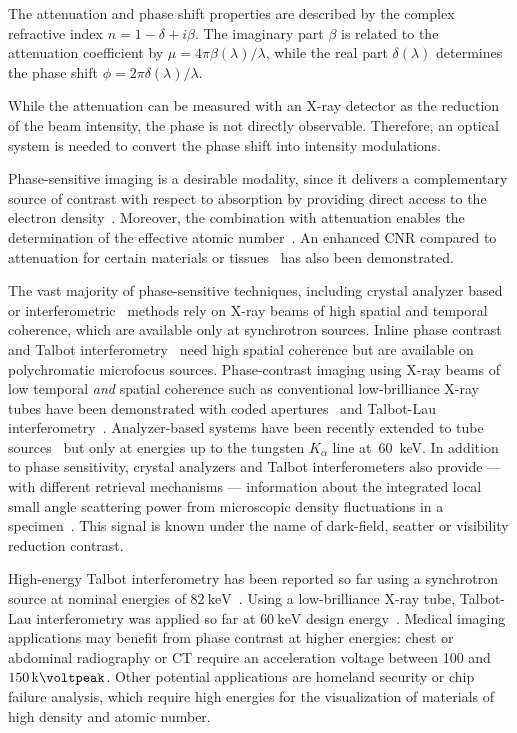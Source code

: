 \documentclass[english]{nature}
\begin{document}
The attenuation and phase shift properties are described by the complex
refractive index $n=1 - \delta + i \beta$. The imaginary part $\beta$ is
related to the attenuation coefficient by $\mu = 4 \pi \beta(\lambda) /
\lambda$, while the real part $\delta(\lambda)$ determines the phase shift
$\phi = 2 \pi \delta(\lambda) / \lambda$.

While the attenuation can be measured with an X-ray detector as the
reduction of the beam intensity, the phase is not directly observable.
Therefore, an optical system is needed to convert the phase shift into
intensity modulations.

Phase-sensitive imaging is a desirable modality, since it delivers a
complementary source of contrast with respect to absorption by providing
direct access to the electron density~\cite[extras{, p.71}]{Als-Nielsen2011}. Moreover, the
combination with attenuation enables the determination of the effective
atomic number~\cite{Qi2010}. An enhanced \ac{CNR} compared to
attenuation for certain materials or
tissues~\cite{Pfeiffer2007a,McDonald2009} has also been demonstrated.

The vast majority of phase-sensitive techniques, including crystal analyzer
based~\cite{Davis1995,Chapman1997} or
interferometric~\cite{Bonse1965,Momose1996} methods rely on X-ray beams of
high spatial and temporal coherence, which are available only at synchrotron
sources. Inline phase contrast~\cite{Snigirev1995,Wilkins1996,Cloetens1996}
and Talbot interferometry~\cite{Cloetens1997,David2002,Momose2003a} need
high spatial coherence but are available on polychromatic microfocus
sources. Phase-contrast imaging using X-ray beams of low temporal \emph{and}
spatial coherence such as conventional low-brilliance X-ray tubes have been
demonstrated with coded apertures~\cite{Munro2012} and Talbot-Lau
interferometry~\cite{Pfeiffer2006}. Analyzer-based systems have been
recently extended to tube sources~\cite{Nesch2009,Parham2009} but only at
energies up to the tungsten $K_\alpha$ line at~\SI{60}{\kilo\eV}. In
addition to phase sensitivity, crystal analyzers and Talbot interferometers
also provide --- with different retrieval mechanisms --- information
about the integrated local small angle scattering power from microscopic
density fluctuations in a specimen~\cite{Pfeiffer2008}. This signal is known
under the name of dark-field, scatter or visibility reduction contrast.

High-energy Talbot interferometry has been reported so far using a
synchrotron source at nominal energies of
$\SI{82}{\kilo\electronvolt}$~\cite{Willner2013}. Using a low-brilliance
X-ray tube, Talbot-Lau interferometry was applied so far at
$\SI{60}{\kilo\electronvolt}$ design energy~\cite{Donath2009a}. Medical imaging
applications may benefit from phase contrast at higher energies: chest or
abdominal radiography or \ac{CT} require an acceleration voltage between
\num{100} and $\SI{150}{\kilo\voltpeak}$. Other potential applications are
homeland security or chip failure analysis, which require high energies for
the visualization of materials of high density and atomic number.
\end{document}
